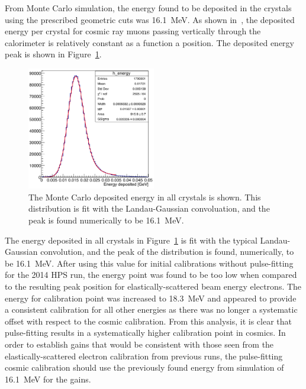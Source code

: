 \documentclass[twoside]{article}
\begin{document}
\indent From Monte Carlo simulation, the energy found to be deposited in the crystals using the prescribed geometric cuts was 16.1~MeV. As shown in~\cite{szumila-vance_hps_2016}, the deposited energy per crystal for cosmic ray muons passing vertically through the calorimeter is relatively constant as a function a position. The deposited energy peak is shown in Figure~\ref{mcedep}.
\begin{figure}[htb]
  \centering
      \includegraphics[width=0.5\textwidth]{pics/mip_mc.png}
  \caption{The Monte Carlo deposited energy in all crystals is shown. This distribution is fit with the Landau-Gaussian convoluation, and the peak is found numerically to be 16.1~MeV.}
  \label{mcedep}
\end{figure}
The energy deposited in all crystals in Figure~\ref{mcedep} is fit with the typical Landau-Gaussian convolution, and the peak of the distribution is found, numerically, to be 16.1~MeV. After using this value for initial calibrations without pulse-fitting for the 2014 HPS run, the energy point was found to be too low when compared to the resulting peak position for elastically-scattered beam energy electrons. The energy for calibration point was increased to 18.3~MeV and appeared to provide a consistent calibration for all other energies as there was no longer a systematic offset with respect to the cosmic calibration. From this analysis, it is clear that pulse-fitting results in a systematically higher calibration point in cosmics. In order to establish gains that would be consistent with those seen from the elastically-scattered electron calibration from previous runs, the pulse-fitting cosmic calibration should use the previously found energy from simulation of 16.1~MeV for the gains. 

\end{document}
